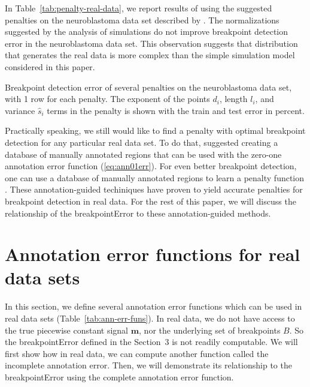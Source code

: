 \documentclass{jsfds} %
\newcommand{\tab}[3][H]{
  \begin{table}[#1]
    \begin{center}
          
    \end{center}
    \caption{#3}
    \label{tab:#2}
  \end{table}
}
\begin{document}
In Table~\ref{tab:penalty-real-data}, we report results of using the
suggested penalties on the neuroblastoma data set described by
\citet{HOCKING-breakpoints}. The normalizations suggested by the
analysis of simulations do not improve breakpoint detection error in
the neuroblastoma data set. This observation suggests that
distribution that generates the real data is more complex than the
simple simulation model considered in this paper.

\tab{penalty-real-data}{Breakpoint detection error of several penalties on the
  neuroblastoma data set, with 1 row for each penalty. The exponent of
  the points $d_i$, length $l_i$, and variance $\hat s_i$ terms in the
  penalty is shown with the train and test error in percent. }

Practically speaking, we still would like to find a penalty with
optimal breakpoint detection for any particular real data set. To do
that, \citet{HOCKING-breakpoints} suggested creating a database of
manually annotated regions that can be used with the zero-one
annotation error function (\ref{eq:ann01err}). For even better
breakpoint detection, one can use a database of manually annotated
regions to learn a penalty function \citep{HOCKING-penalties}. These
annotation-guided techiniques have proven to yield accurate penalties
for breakpoint detection in real data. For the rest of this paper, we
will discuss the relationship of the breakpointError to these
annotation-guided methods.






\newpage

\section{Annotation error functions for real data sets}
\label{sec:relaxation}

In this section, we define several annotation error functions which
can be used in real data sets (Table~\ref{tab:ann-err-funs}).  In real
data, we do not have access to the true piecewise constant signal
$\mathbf m$, nor the underlying set of breakpoints $B$. So the
breakpointError defined in the Section~3 is not readily
computable. We will first show how in real data, we can compute
another function called the incomplete annotation error. Then, we will
demonstrate its relationship to the breakpointError using the complete
annotation error function.
\end{document}
